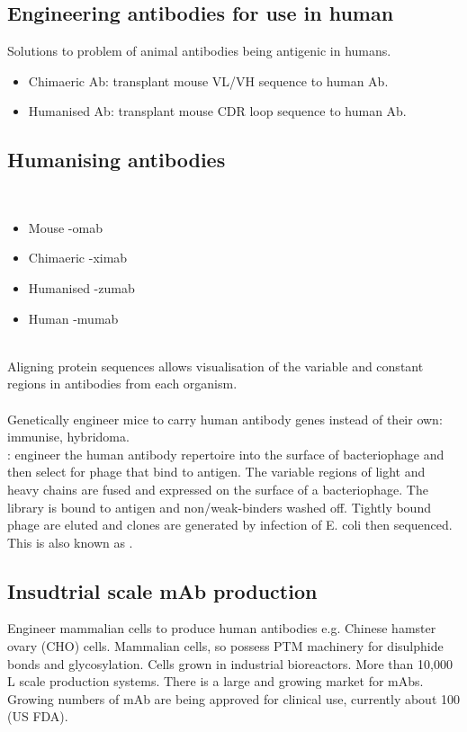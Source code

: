 \subsection{Engineering antibodies for use in human}
Solutions to problem of animal antibodies being antigenic in humans.
\begin{itemize}
    \item Chimaeric Ab: transplant mouse VL/VH sequence to human Ab.
    \item Humanised Ab: transplant mouse CDR loop sequence to human Ab.
\end{itemize}
\subsection{Humanising antibodies}
\\
\begin{itemize}[noitemsep]
    \item Mouse -omab 
    \item Chimaeric -ximab 
    \item Humanised -zumab 
    \item Human -mumab
\end{itemize}
\\[.1in]
Aligning protein sequences allows visualisation of the variable and constant regions in antibodies from each organism.\\[.2in]
\\[.1in]
Genetically engineer mice to carry human antibody genes instead of their own: immunise, hybridoma.\\[.2in]
: engineer the human antibody repertoire into the surface of bacteriophage and then select for phage that bind to antigen. The variable regions of light and heavy chains are fused and expressed on the surface of a bacteriophage. The library is bound to antigen and non/weak-binders washed off. Tightly bound phage are eluted and clones are generated by infection of E. coli then sequenced. This is also known as .
\subsection{Insudtrial scale mAb production}
Engineer mammalian cells to produce human antibodies e.g. Chinese hamster ovary (CHO) cells. Mammalian cells, so possess PTM machinery for disulphide bonds and glycosylation. Cells grown in industrial bioreactors. More than 10,000 L scale production systems. There is a large and growing market for mAbs. Growing numbers of mAb are being approved for clinical use, currently about 100 (US FDA).
